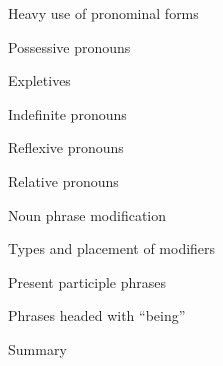 \begin{listWWNumviiileveli}
\begin{listWWNumviiilevelii}
\setcounter{listWWNumviiileveliii}{0}
\begin{listWWNumviiileveliii}
\item 
\begin{styleListParagraph}
Heavy use of pronominal forms
\end{styleListParagraph}
\item 
\begin{styleListParagraph}
Possessive pronouns 
\end{styleListParagraph}
\item 
\begin{styleListParagraph}
Expletives 
\end{styleListParagraph}
\item 
\begin{styleListParagraph}
Indefinite pronouns 
\end{styleListParagraph}
\item 
\begin{styleListParagraph}
Reflexive pronouns 
\end{styleListParagraph}
\item 
\begin{styleListParagraph}
Relative pronouns 
\end{styleListParagraph}
\end{listWWNumviiileveliii}
\item 
\begin{styleListParagraph}
Noun phrase modification 
\end{styleListParagraph}


\setcounter{listWWNumviiileveliii}{0}
\begin{listWWNumviiileveliii}
\item 
\begin{styleListParagraph}
Types and placement of modifiers
\end{styleListParagraph}
\item 
\begin{styleListParagraph}
Present participle phrases 
\end{styleListParagraph}
\item 
\begin{styleListParagraph}
Phrases headed with “being” 
\end{styleListParagraph}
\end{listWWNumviiileveliii}
\item 
\begin{styleListParagraph}
Summary 
\end{styleListParagraph}
\end{listWWNumviiilevelii}
\end{listWWNumviiileveli}

